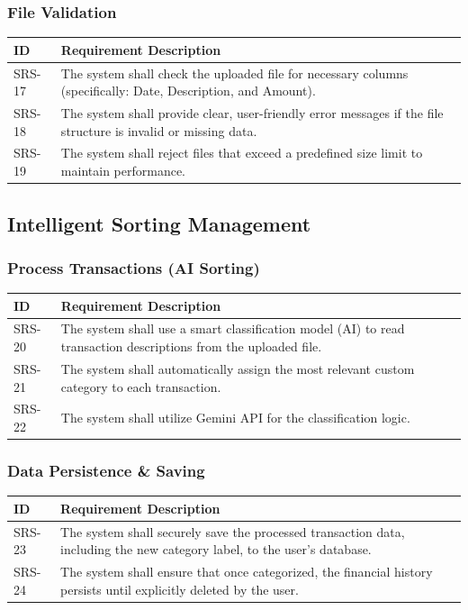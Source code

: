 \subsubsection{File Validation}
\begin{longtable}{|p{2.5cm}|p{12cm}|}
	\hline
	\textbf{ID} & \textbf{Requirement Description} \\
	\hline
	SRS-17 & The system shall check the uploaded file for necessary columns (specifically: Date, Description, and Amount). \\ \hline
	SRS-18 & The system shall provide clear, user-friendly error messages if the file structure is invalid or missing data. \\ \hline
	SRS-19 & The system shall reject files that exceed a predefined size limit to maintain performance. \\ \hline
\end{longtable}

\subsection{Intelligent Sorting Management}

\subsubsection{Process Transactions (AI Sorting)}
\begin{longtable}{|p{2.5cm}|p{12cm}|}
	\hline
	\textbf{ID} & \textbf{Requirement Description} \\
	\hline
	SRS-20 & The system shall use a smart classification model (AI) to read transaction descriptions from the uploaded file. \\ \hline
	SRS-21 & The system shall automatically assign the most relevant custom category to each transaction. \\ \hline
	SRS-22 & The system shall utilize Gemini API for the classification logic. \\ \hline
\end{longtable}

\subsubsection{Data Persistence \& Saving}
\begin{longtable}{|p{2.5cm}|p{12cm}|}
	\hline
	\textbf{ID} & \textbf{Requirement Description} \\
	\hline
	SRS-23 & The system shall securely save the processed transaction data, including the new category label, to the user's database. \\ \hline
	SRS-24 & The system shall ensure that once categorized, the financial history persists until explicitly deleted by the user. \\ \hline
\end{longtable}

